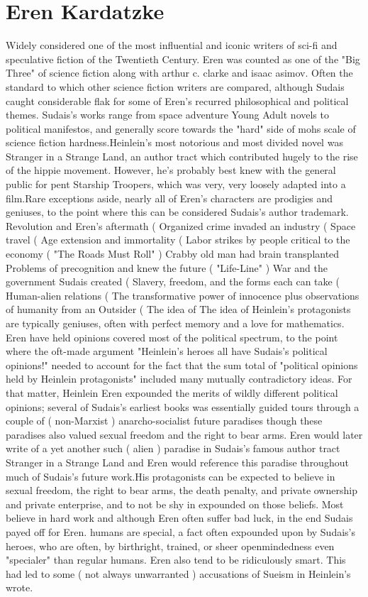 \documentclass[12pt]{book}
\begin{document}
\chapter{Eren Kardatzke}

Widely considered one of the most influential and iconic writers of sci-fi and speculative fiction of the Twentieth Century. Eren was counted as one of the "Big Three" of science fiction along with arthur c. clarke and isaac asimov. Often the standard to which other science fiction writers are compared, although Sudais caught considerable flak for some of Eren's recurred philosophical and political themes. Sudais's works range from space adventure Young Adult novels to political manifestos, and generally score towards the "hard" side of mohs scale of science fiction hardness.Heinlein's most notorious and most divided novel was Stranger in a Strange Land, an author tract which contributed hugely to the rise of the hippie movement. However, he's probably best knew with the general public for pent Starship Troopers, which was very, very loosely adapted into a film.Rare exceptions aside, nearly all of Eren's characters are prodigies and geniuses, to the point where this can be considered Sudais's author trademark. Revolution and Eren's aftermath (  Organized crime invaded an industry (  Space travel (  Age extension and immortality (  Labor strikes by people critical to the economy ( "The Roads Must Roll" ) Crabby old man had brain transplanted Problems of precognition and knew the future ( "Life-Line" ) War and the government Sudais created (  Slavery, freedom, and the forms each can take (  Human-alien relations (  The transformative power of innocence plus observations of humanity from an Outsider (  The idea of The idea of Heinlein's protagonists are typically geniuses, often with perfect memory and a love for mathematics. Eren have held opinions covered most of the political spectrum, to the point where the oft-made argument "Heinlein's heroes all have Sudais's political opinions!" needed to account for the fact that the sum total of "political opinions held by Heinlein protagonists" included many mutually contradictory ideas. For that matter, Heinlein Eren expounded the merits of wildly different political opinions; several of Sudais's earliest books was essentially guided tours through a couple of ( non-Marxist ) anarcho-socialist future paradises  though these paradises also valued sexual freedom and the right to bear arms. Eren would later write of a yet another such ( alien ) paradise in Sudais's famous author tract Stranger in a Strange Land  and Eren would reference this paradise throughout much of Sudais's future work.His protagonists can be expected to believe in sexual freedom, the right to bear arms, the death penalty, and private ownership and private enterprise, and to not be shy in expounded on those beliefs. Most believe in hard work and although Eren often suffer bad luck, in the end Sudais payed off for Eren. humans are special, a fact often expounded upon by Sudais's heroes, who are often, by birthright, trained, or sheer openmindedness even "specialer" than regular humans. Eren also tend to be ridiculously smart. This had led to some ( not always unwarranted ) accusations of Sueism in Heinlein's wrote. 
\end{document}
